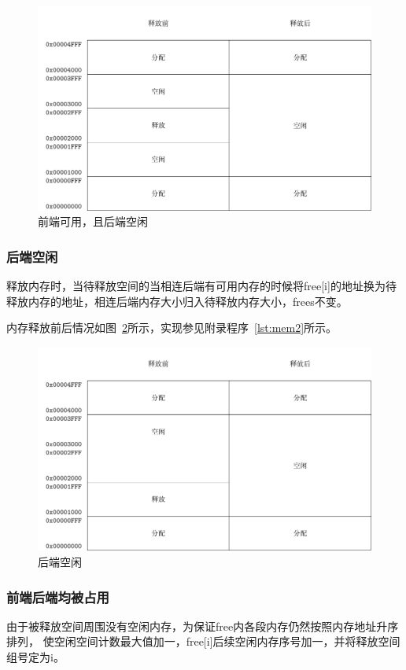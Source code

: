 \begin{figure}[H]
  \centering
  \includegraphics[width=.7\textwidth]{../Fig/mem1.pdf}
  \caption{前端可用，且后端空闲}
  \label{fig:mem1}
\end{figure}


\subsubsection{后端空闲}

释放内存时，当待释放空间的当相连后端有可用内存的时候将free[i]的地址换为待释放内存的地址，相连后端内存大小归入待释放内存大小，frees不变。

内存释放前后情况如图~\ref{fig:mem2}所示，实现参见附录程序~\ref{lst:mem2}所示。

\begin{figure}[H]
  \centering
  \includegraphics[width=.7\textwidth]{../Fig/mem2.pdf}
  \caption{后端空闲}
  \label{fig:mem2}
\end{figure}


\subsubsection{前端后端均被占用}

由于被释放空间周围没有空闲内存，为保证free内各段内存仍然按照内存地址升序排列，
使空闲空间计数最大值加一，free[i]后续空闲内存序号加一，并将释放空间组号定为i。

